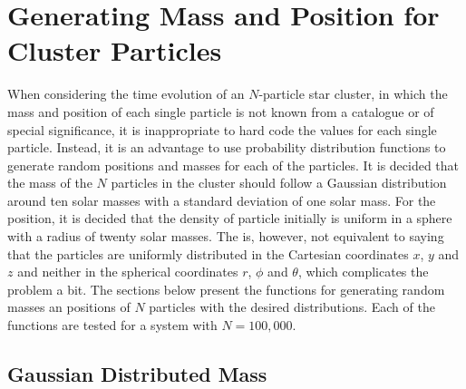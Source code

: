 \section{Generating Mass and Position for Cluster Particles}
\label{Method:GeneratingPosMassVel}
When considering the time evolution of an $N$-particle star cluster, in which the mass and position of each single particle is not known from a catalogue or of special significance, it is inappropriate to hard code the values for each single particle. 
Instead, it is an advantage to use probability distribution functions to generate random positions and masses for each of the particles. 
It is decided that the mass of the $N$ particles in the cluster should follow a Gaussian distribution around ten solar masses with a standard deviation of one solar mass.
For the position, it is decided that the density of particle initially is uniform in a sphere with a radius of twenty solar masses.
The is, however, not equivalent to saying that the particles are uniformly distributed in the Cartesian coordinates $x$, $y$ and $z$ and neither in the spherical coordinates $r$, $\phi$ and $\theta$, which complicates the problem a bit.
The sections below present the functions for generating random masses an positions of $N$ particles with the desired distributions. 
Each of the functions are tested for a system with $N=100,000$.

\subsection{Gaussian Distributed Mass}

